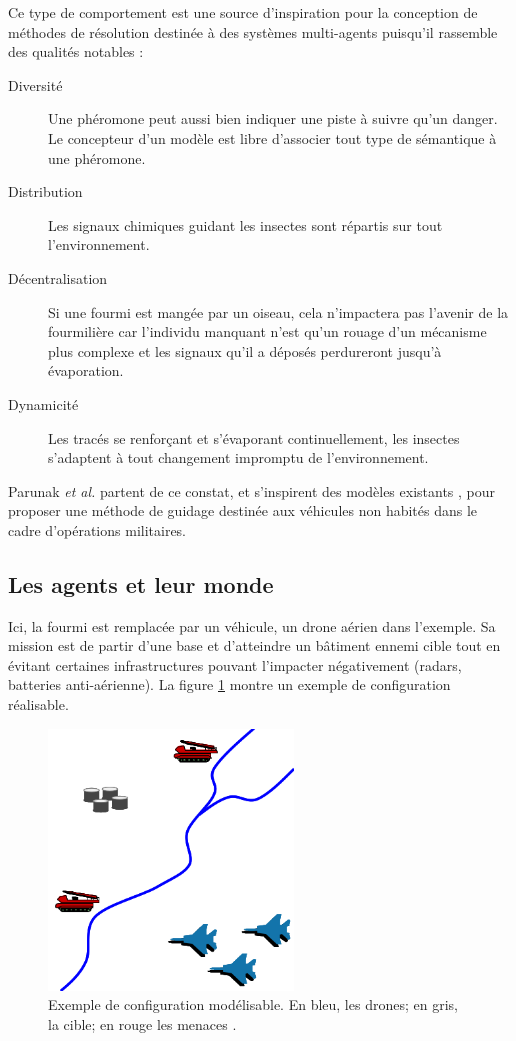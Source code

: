 \documentclass[12pt]{article}
\begin{document}
Ce type de comportement est une source d'inspiration pour la
conception de méthodes de résolution destinée à des systèmes
multi-agents puisqu'il rassemble des qualités notables \cite{parunak}
:

\begin{description}
\item[Diversité]{Une phéromone peut aussi bien indiquer une piste à
  suivre qu'un danger. Le concepteur d'un modèle est libre d'associer
  tout type de sémantique à une phéromone.}
\item[Distribution]{Les signaux chimiques guidant les insectes sont
  répartis sur tout l'environnement.}
\item[Décentralisation]{Si une fourmi est mangée par un oiseau, cela
  n'impactera pas l'avenir de la fourmilière car l'individu manquant
  n'est qu'un rouage d'un mécanisme plus complexe et les signaux qu'il
  a déposés perdureront jusqu'à évaporation.}
\item[Dynamicité]{Les tracés se renforçant et s'évaporant
  continuellement, les insectes s'adaptent à tout changement impromptu
  de l'environnement.}
\end{description}

Parunak \textit{et al.} partent de ce constat, et s'inspirent des
modèles existants \cite{dorigo}, pour proposer une méthode de guidage
destinée aux véhicules non habités dans le cadre d'opérations
militaires.

\subsection{Les agents et leur monde}

Ici, la fourmi est remplacée par un véhicule, un drone aérien dans
l'exemple. Sa mission est de partir d'une base et d'atteindre un
bâtiment ennemi cible tout en évitant certaines infrastructures
pouvant l'impacter négativement (radars, batteries anti-aérienne). La
figure \ref{real} montre un exemple de configuration réalisable.

\begin{figure}[H]
  \centering

  \includegraphics[width=6.5cm]{terrain_real.png}

  \caption{Exemple de configuration modélisable. En bleu, les drones;
    en gris, la cible; en rouge les menaces \cite{parunak}.}
  \label{real}
\end{figure}
\end{document}
